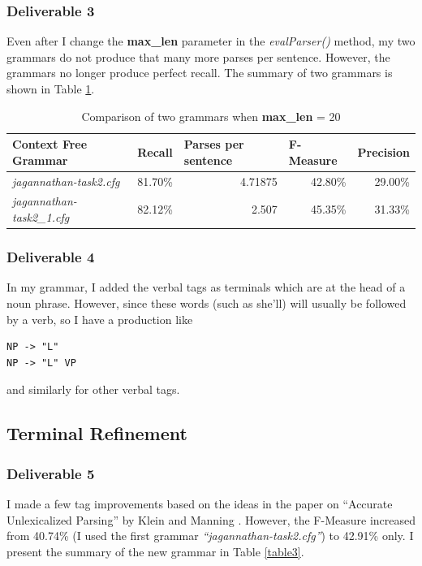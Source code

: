 \documentclass[10pt, letter]{article}
\begin{document}
\subsubsection*{Deliverable 3}
Even after I change the \textbf{max\_len} parameter in the \textit{evalParser()} method, my two grammars do not produce that many more parses per sentence. However, the grammars no longer produce perfect recall. The summary of two grammars is shown in Table \ref{table2}.

\begin{table}[htbp]
\centering
\begin{tabular}{|l|r|r|r|r|}
\hline
Context Free Grammar & \multicolumn{1}{l|}{Recall} & \multicolumn{1}{l|}{Parses per sentence} & \multicolumn{1}{l|}{F-Measure} & \multicolumn{1}{l|}{Precision} \\ \hline
\textit{jagannathan-task2.cfg} & 81.70\% & 4.71875 & 42.80\% & 29.00\% \\ \hline
\textit{jagannathan-task2\_1.cfg} & 82.12\% & 2.507 & 45.35\% & 31.33\% \\ \hline
\end{tabular}
\caption{Comparison of two grammars when \textbf{max\_len} = 20}
\label{table2}
\end{table}

\subsubsection*{Deliverable 4}
In my grammar, I added the verbal tags as terminals which are at the head of a noun phrase. However, since these words (such as she'll) will usually be followed by a verb, so I have a production like
\begin{verbatim}
NP -> "L"
NP -> "L" VP
\end{verbatim}
and similarly for other verbal tags.

\subsection{Terminal Refinement}
\subsubsection*{Deliverable 5}
I made a few tag improvements based on the ideas in the paper on ``Accurate Unlexicalized Parsing'' by Klein and Manning \cite{klein2003accurate}. However, the F-Measure increased from 40.74\% (I used the first grammar \textit{``jagannathan-task2.cfg''}) to 42.91\% only. I present the summary of the new grammar in Table \ref{table3}.
\end{document}
